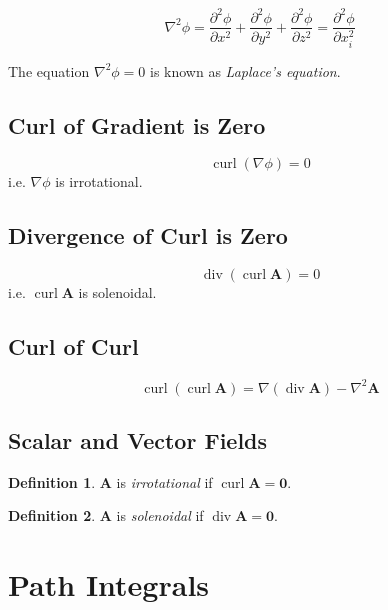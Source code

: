 \documentclass{article}
\theoremstyle{definition}
\theoremstyle{definition}
\newtheorem*{defn}{Definition}
\theoremstyle{remark}
\newcommand{\vecA}{\mathbf{A}}
\DeclareMathOperator{\vdiv}{div}
\DeclareMathOperator{\vcurl}{curl}
\begin{document}
\begin{equation*}
    \nabla^2 \phi = \frac{\partial^2 \phi}{\partial x^2} + \frac{\partial^2 \phi}{\partial y^2} + \frac{\partial^2 \phi}{\partial z^2} = \frac{\partial^2 \phi}{\partial x_i^2}
\end{equation*}

The equation $\nabla^2 \phi = 0$ is known as \emph{Laplace's equation}.

\subsection{Curl of Gradient is Zero}

\begin{equation*}
    \vcurl (\nabla \phi) = 0
\end{equation*}
i.e. $\nabla \phi$ is irrotational.

\subsection{Divergence of Curl is Zero}

\begin{equation*}
    \vdiv (\vcurl \vecA) = 0
\end{equation*}
i.e. $\vcurl \vecA$ is solenoidal.

\subsection{Curl of Curl}

\begin{equation*}
    \vcurl (\vcurl \vecA) = \nabla (\vdiv \vecA) - \nabla^2 \vecA
\end{equation*}

\subsection{Scalar and Vector Fields}

\begin{defn}
    $\vecA$ is \emph{irrotational} if $\vcurl \vecA = \mathbf{0}$.
\end{defn}

\begin{defn}
    $\vecA$ is \emph{solenoidal} if $\vdiv \vecA = \mathbf{0}$.
\end{defn}

\section{Path Integrals}
\end{document}
